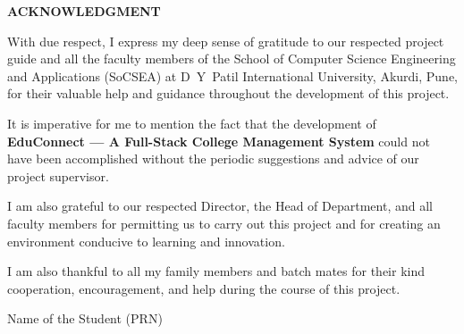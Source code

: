 
\newpage
\begin{center}
  \textbf{\large \bf{ACKNOWLEDGMENT}}  
\end{center}
\hline

\normalsize
{}
\vspace{0.5cm}
With due respect, I express my deep sense of gratitude to our respected project guide and all the faculty members of the School of Computer Science Engineering and Applications (SoCSEA) at D~Y~Patil International University, Akurdi, Pune, for their valuable help and guidance throughout the development of this project.

It is imperative for me to mention the fact that the development of \textbf{EduConnect --- A Full-Stack College Management System} could not have been accomplished without the periodic suggestions and advice of our project supervisor.

I am also grateful to our respected Director, the Head of Department, and all faculty members for permitting us to carry out this project and for creating an environment conducive to learning and innovation.

I am also thankful to all my family members and batch mates for their kind cooperation, encouragement, and help during the course of this project.

\vspace{1cm}
Name of the Student  (PRN)\\
